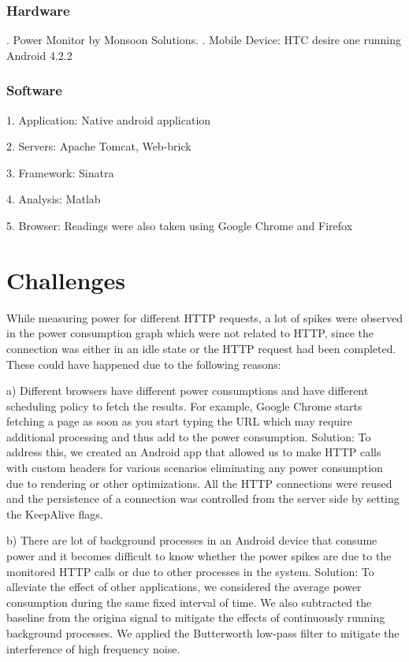 \documentclass[9pt]{sigplan-proc-varsize}
\begin{document}
\subsubsection{Hardware}

. Power Monitor by Monsoon Solutions. . Mobile Device: HTC desire one running Android 4.2.2

\subsubsection{Software}

1. Application: Native android application

2. Servers: Apache Tomcat, Web-brick

3. Framework: Sinatra

4. Analysis: Matlab

5. Browser: Readings were also taken using Google Chrome and Firefox

\bigskip

\section{ Challenges}

While measuring power for different HTTP requests, a lot of spikes were observed in the power consumption graph which were not related to HTTP, since the connection was either in an idle state or the HTTP request had been completed. These could have happened due to the following reasons: 

a) Different browsers have different power consumptions and have different scheduling policy to fetch the results. For example, Google Chrome starts fetching a page as soon as you start typing the URL which may require additional processing and thus add to the power consumption.
Solution: To address this, we created an Android app that allowed us to make HTTP calls with custom headers for various scenarios eliminating any power consumption due to rendering or other optimizations. All the HTTP connections were reused and the persistence of a connection was controlled from the server side by setting the KeepAlive flags.

b) There are lot of background processes in an Android device that consume power and it becomes difficult to know whether the power spikes are due to the monitored HTTP calls or due to other processes in the system.
Solution: To alleviate the effect of other applications, we considered the average power consumption during the same fixed interval of time. We also subtracted the baseline from the origina signal to mitigate the effects of continuously running background processes. We applied the Butterworth low-pass filter to mitigate the interference of high frequency noise.
\end{document}
